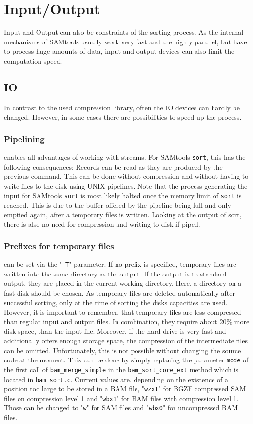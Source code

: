 \section{Input/Output} 
Input and Output can also be constraints of the sorting process. As the internal mechanisms of SAMtools usually work very fast and are highly parallel, but have to process huge amounts of data, input and output devices can also limit the computation speed.

\subsection{IO}
In contrast to the used compression library, often the IO devices can hardly be changed. However, in some cases there are possibilities to speed up the process.

\subsubsection{Pipelining} enables all advantages of working with streams. For SAMtools \texttt{sort}, this has the following consequences: Records can be read as they are produced by the previous command. This can be done without compression and without having to write files to the disk using UNIX pipelines. Note that the process generating the input for SAMtools \texttt{sort} is most likely halted once the memory limit of \texttt{sort} is reached. This is due to the buffer offered by the pipeline being full and only emptied again, after a temporary files is written. Looking at the output of sort, there is also no need for compression and writing to disk if piped. 

\subsubsection{Prefixes for temporary files} can be set via the "\texttt{-T}" parameter. If no prefix is specified, temporary files are written into the same directory as the output. If the output is to standard output, they are placed in the current working directory. Here, a directory on a fast disk should be chosen. As temporary files are deleted automatically after successful sorting, only at the time of sorting the disks capacities are used. However, it is important to remember, that temporary files are less compressed than regular input and output files. In combination, they require about 20\% more disk space, than the input file. Moreover, if the hard drive is very fast and additionally offers enough storage space, the compression of the intermediate files can be omitted. Unfortunately, this is not possible without changing the source code at the moment. This can be done by simply replacing the parameter \texttt{mode} of the first call of \texttt{bam\_merge\_simple} in the \texttt{bam\_sort\_core\_ext} method which is located in \texttt{bam\_sort.c}. Current values are, depending on the existence of a position too large to be stored in a BAM file, "\texttt{wzx1}" for BGZF compressed SAM files on compression level 1 and "\texttt{wbx1}" for BAM files with compression level 1. Those can be changed to "\texttt{w}" for SAM files and "\texttt{wbx0}" for uncompressed BAM files.